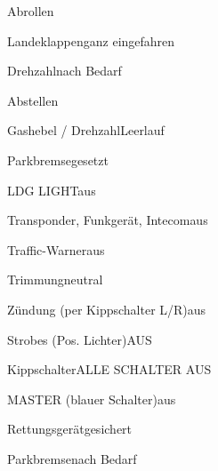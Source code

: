 \begin{checklist}{Abrollen}
	\item{Landeklappen}{ganz eingefahren}
	\item{Drehzahl}{nach Bedarf}
\end{checklist}


\begin{checklist}{Abstellen}
	  \item{Gashebel / Drehzahl}{Leerlauf}
	  \item{Parkbremse}{gesetzt}
	  \item{LDG LIGHT}{aus}
	  \item{Transponder, Funkgerät, Intecom}{aus}
	  \item{Traffic-Warner}{aus}
	  \item{Trimmung}{neutral}
	  \item{Zündung (per Kippschalter L/R)}{aus}
	  

	\item{Strobes (Pos. Lichter)}{AUS}
	\item{Kippschalter}{ALLE SCHALTER AUS}
	\item{MASTER (blauer Schalter)}{aus}
	\item{Rettungsgerät}{gesichert}
	

	  \item{Parkbremse}{nach Bedarf}
\end{checklist}


